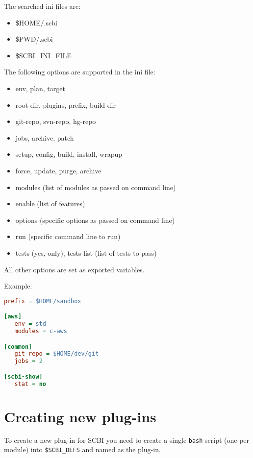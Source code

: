 \documentclass[a4paper,12pt,twoside]{article}
\newcommand{\code}[1]{\texttt{#1}}
\let\stdsection\section
\renewcommand\section{\newpage\stdsection}
\begin{document}
The searched ini files are:

\begin{itemize}
	\item \$HOME/.scbi
	\item \$PWD/.scbi
	\item \$SCBI\_INI\_FILE
\end{itemize}

The following options are supported in the ini file:

\begin{itemize}
	\item env, plan, target
	\item root-dir, plugins, prefix, build-dir
	\item git-repo, svn-repo, hg-repo
	\item jobs, archive, patch
	\item setup, config, build, install, wrapup
	\item force, update, purge, archive
	\item modules (list of modules as passed on command line)
	\item enable (list of features)
	\item options (specific options as passed on command line)
	\item run (specific command line to run)
	\item tests (yes, only), tests-list (list of tests to pass)
\end{itemize}

All other options are set as exported variables.

Example:

\begin{lstlisting}[language={Ini}]
prefix = $HOME/sandbox

[aws]
   env = std
   modules = c-aws

[common]
   git-repo = $HOME/dev/git
   jobs = 2

[scbi-show]
   stat = no
\end{lstlisting}


\section{Creating new plug-ins}

To create a new plug-in for SCBI you need to create a single \code{bash} script (one per module) into \code{\$SCBI\_DEFS} and named as the plug-in.
\end{document}
